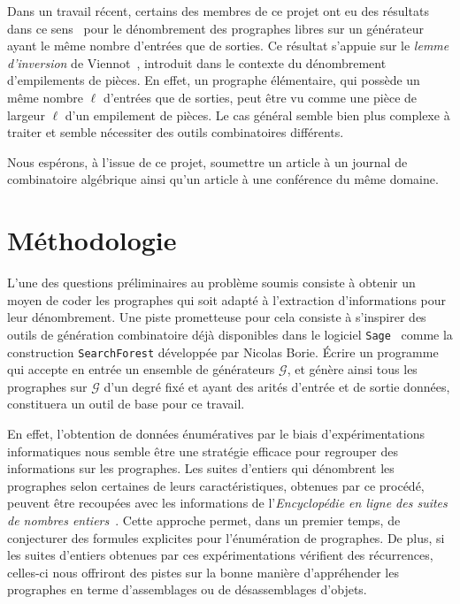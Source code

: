 \documentclass[10pt,reqno]{amsart}
\numberwithin{equation}{subsection}
\newcommand{\Gen}{\mathcal{G}}
\begin{document}
Dans un travail récent, certains des membres de ce projet ont eu des
résultats dans ce sens~\cite{BG14} pour le dénombrement des prographes
libres sur un générateur ayant le même nombre d'entrées que de sorties.
Ce résultat s'appuie sur le {\em lemme d'inversion} de Viennot~\cite{Vie86},
introduit dans le contexte du dénombrement d'empilements de pièces. En
effet, un prographe élémentaire, qui possède un même nombre $\ell$
d'entrées que de sorties, peut être vu comme une pièce de largeur $\ell$
d'un empilement de pièces. Le cas général semble bien plus complexe à
traiter et semble nécessiter des outils combinatoires différents.

Nous espérons, à l'issue de ce projet, soumettre un article à un journal
de combinatoire algébrique ainsi qu'un article à une conférence du
même domaine.

\section{Méthodologie}
L'une des questions préliminaires au problème soumis consiste à obtenir
un moyen de coder les prographes qui soit adapté à l'extraction
d'informations pour leur dénombrement. Une piste prometteuse pour cela
consiste à s'inspirer des outils de génération combinatoire déjà
disponibles dans le logiciel \texttt{Sage}~\cite{Sage} comme la construction
\texttt{SearchForest} développée par Nicolas Borie. Écrire un programme
qui accepte en entrée un ensemble de générateurs $\Gen$, et génère ainsi
tous les prographes sur $\Gen$ d'un degré fixé et ayant des arités
d'entrée et de sortie données, constituera un outil de base pour ce travail.

En effet, l'obtention de données énumératives par le biais
d'expérimentations informatiques nous semble être une stratégie efficace
pour regrouper des informations sur les prographes. Les suites d'entiers
qui dénombrent les prographes selon certaines de leurs caractéristiques,
obtenues par ce procédé, peuvent être recoupées avec les informations
de l'{\em Encyclopédie en ligne des suites de nombres entiers}~\cite{Slo}.
Cette approche permet, dans un premier temps, de conjecturer des formules
explicites pour l'énumération de prographes. De plus, si les suites
d'entiers obtenues par ces expérimentations vérifient des récurrences,
celles-ci nous offriront des pistes sur la bonne manière d'appréhender les
prographes en terme d'assemblages ou de désassemblages d'objets.
\end{document}
